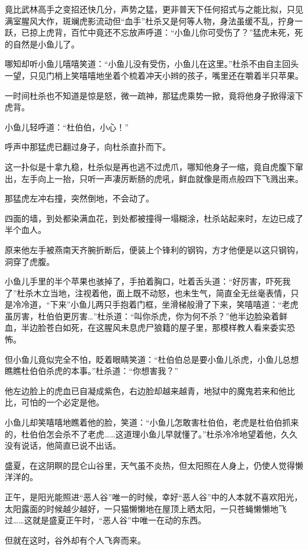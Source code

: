 \documentclass[12pt,oneside]{book}
\begin{document}
竟比武林高手之变招还快几分，声势之猛，更非普天下任何招式与之能比拟，只见满室腥风大作，斑斓虎影流动但``血手''杜杀又是何等人物，身法虽缓不乱，拧身一跃，已掠上虎背，百忙中竟还不忘放声呼道：``小鱼儿你可受伤了？''猛虎未死，死的自然是小鱼儿了。

哪知却听小鱼儿嘻嘻笑道：``小鱼儿没有受伤，小鱼儿在这里。''杜杀不由自主回头一望，只见门梢上笑嘻嘻地坐着个梳着冲天小辫的孩子，嘴里还在嚼着半只苹果。

一时间杜杀也不知道是惊是怒，微一疏神，那猛虎乘势一掀，竟将他身子掀得滚下虎背。

小鱼儿轻呼道：``杜伯伯，小心！''

呼声中那猛虎已翻过身子，向杜杀直扑而下。

这一扑似是十拿九稳，杜杀似是再也逃不过虎爪，哪知他身子一缩，竟自虎腹下窜出，左手向上一抬，只听一声凄厉断肠的虎吼，鲜血就像是雨点般四下飞溅出来。

那猛虎左冲右撞，突然倒地，不会动了。

四面的墙，到处都染满血花，到处都被撞得一塌糊涂，杜杀站起来时，左边已成了半个血人。

原来他左手被燕南天齐腕折断后，便装上个锋利的钢钩，方才他便是以这只钢钩，洞穿了虎腹。

小鱼儿手里的半个苹果也骇掉了，手拍着胸口，吐着舌头道：``好厉害，吓死我了''杜杀木立当地，注视着他，面上既不动怒，也未生气，简直全无丝毫表情，只是冷冷道，``下来''小鱼儿两只手抱着门框，坐滑梯般滑了下来，笑嘻嘻道：``老虎虽厉害，杜伯伯更厉害\ldots{}''杜杀道：``叫你杀虎，你为何不杀？''他半边脸染着鲜血，半边脸苍白如死，在这腥风未息虎尸狼籍的屋子里，那模样教人看来委实恐怖。

但小鱼儿竟似完全不怕，眨着眼睛笑道：``杜伯伯总是要小鱼儿杀虎，小鱼儿总想瞧瞧杜伯伯杀虎的本事。''杜杀道：``你想害我？''

他左边脸上的虎血已自凝成紫色，右边脸却越来越青，地狱中的魔鬼若来和他比比，可怕的一个必定是他。

小鱼儿却笑嘻嘻地瞧着他的脸，笑道：``小鱼儿怎敢害杜伯伯，老虎是杜伯伯抓来的，杜伯伯怎会杀不了老虎\ldots\ldots 这道理小鱼儿早就懂了。''杜杀冷冷地望着他，久久没有说话，他简直已说不出话。

盛夏，在这阴瞑的昆仑山谷里，天气虽不炎热，但太阳照在人身上，仍使人觉得懒洋洋的。

正午，是阳光能照进``恶人谷''唯一的时候，幸好``恶人谷''中的人本就不喜欢阳光，太阳露面的时候越少越好，一只猫懒懒地在屋顶上晒太阳，一只苍蝇懒懒地飞过\ldots\ldots 这就是盛夏正午时，``恶人谷''中唯一在动的东西。

但就在这时，谷外却有个人飞奔而来。
\end{document}
